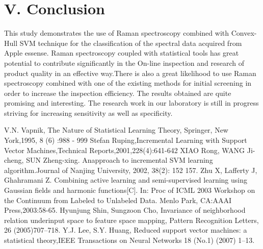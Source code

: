 \documentclass[a4paper]{article}
\begin{document}
\section{V.	Conclusion}
This  study  demonstrates  the  use  of  Raman  spectroscopy  combined  with Convex-Hull SVM  technique  for the  classification  of  the  spectral  data  acquired  from  Apple essense. Raman  spectroscopy  coupled  with  statistical  tools  has  great  potential  to  contribute significantly in the On-line inspection and research of product quality in an effective way.There is also a great  likelihood  to  use  Raman  spectroscopy  combined  with  one  of  the  existing  methods  for initial screening in order to increase the inspection efficiency. The results obtained are quite promising and interesting. The research work in our laboratory is still in progress striving for increasing sensitivity as well as specificity.

\renewcommand\refname{References}
\begin{thebibliography}{99}
    V.N. Vapnik, The Nature of Statistical Learning Theory, Springer, New York,1995, 8 (6) :988 - 999
    Stefan Ruping,Incremental Learning with Support Vector Machines,Technical Reports,2001,228(4):641-642
    XIAO Rong, WANG Ji-cheng, SUN Zheng-xing. Anapproach to incremental SVM learning algorithm.Journal of Nanjing University, 2002, 38(2): 152 157.
    Zhu X, Lafferty J, Ghahramani Z. Combining active learning and semi-supervised learning using Gaussian fields  and  harmonic  functions[C].  In:  Proc  of  ICML  2003  Workshop  on  the  Continuum  from  Labeled  to Unlabeled Data. Menlo Park, CA:AAAI Press,2003:58-65.
    Hyunjung Shin, Sungzoon Cho, Invariance of neighborhood relation underinput space to feature space mapping, Pattern Recognition Letters, 26 (2005)707–718.
    Y.J. Lee, S.Y. Huang, Reduced support vector machines: a statistical theory,IEEE Transactions on Neural Networks 18 (No.1) (2007) 1–13.
\end{thebibliography}
\end{document}
